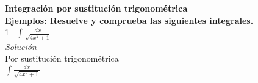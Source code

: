 \documentclass[12pt,a4paper]{article}
\begin{document}
{\bf Integración por sustitución trigonométrica}\\

{\bf Ejemplos: Resuelve y comprueba las siguientes integrales.}\\

\textcircled{1}\ $\displaystyle{\int\frac{dx}{\sqrt{4x^2+1}}}$\\

{\it Solución}\\

Por sustitución trigonométrica\\
$\displaystyle{\int\frac{dx}{\sqrt{4x^2+1}}}=$\\
\end{document}
